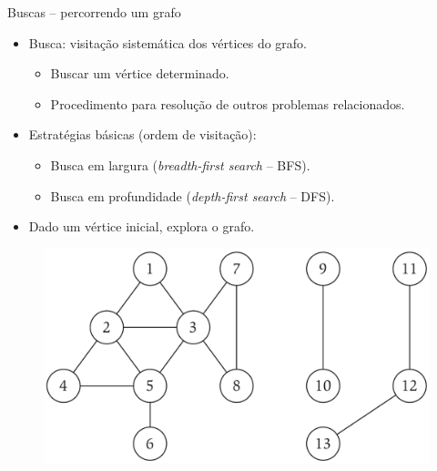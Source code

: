 \begin{frame}{Buscas -- percorrendo um grafo}

	\begin{itemize}
		\item {\color{magenta}Busca:} visitação sistemática dos vértices do grafo.
		\begin{itemize}
			\item Buscar um vértice determinado.
			\item Procedimento para resolução de outros problemas relacionados.
		\end{itemize}
	
		\item Estratégias básicas (ordem de visitação):
		\begin{itemize}
			\item Busca em largura (\textit{breadth-first search} -- BFS).
			\item Busca em profundidade (\textit{depth-first search} -- DFS).
		\end{itemize}
	
		\item Dado um vértice inicial, explora o grafo.
	\end{itemize}

	\begin{figure}
		\centering
		\includegraphics[width=0.375\linewidth,trim={0 0 15cm 0},clip]{img/conectividade}
	\end{figure}
\end{frame}



